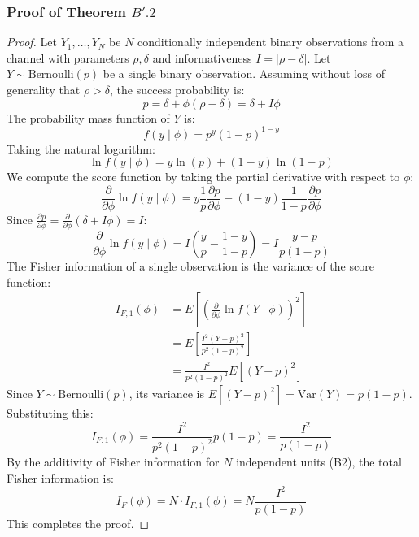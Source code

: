 \documentclass[11pt,a4paper]{article}
\begin{document}
\subsubsection{Proof of Theorem $B'.2$}
\begin{proof}
Let $Y_1, \dots, Y_N$ be $N$ conditionally independent binary observations from a channel with parameters $\rho, \delta$ and informativeness $I = |\rho - \delta|$. Let $Y \sim \text{Bernoulli}(p)$ be a single binary observation. Assuming without loss of generality that $\rho > \delta$, the success probability is:
\[
p = \delta + \phi(\rho - \delta) = \delta + I\phi
\]
The probability mass function of $Y$ is:
\[
f(y \mid \phi) = p^y (1 - p)^{1 - y}
\]
Taking the natural logarithm:
\[
\ln f(y \mid \phi) = y \ln(p) + (1 - y) \ln(1 - p)
\]
We compute the score function by taking the partial derivative with respect to $\phi$:
\[
\frac{\partial}{\partial \phi} \ln f(y \mid \phi) = y \frac{1}{p} \frac{\partial p}{\partial \phi} - (1 - y) \frac{1}{1 - p} \frac{\partial p}{\partial \phi}
\]
Since $\frac{\partial p}{\partial \phi} = \frac{\partial}{\partial \phi} (\delta + I\phi) = I$:
\[
\frac{\partial}{\partial \phi} \ln f(y \mid \phi) = I \left( \frac{y}{p} - \frac{1 - y}{1 - p} \right) = I \frac{y - p}{p(1 - p)}
\]
The Fisher information of a single observation is the variance of the score function:
\begin{align*}
    I_{F, 1}(\phi) &= E\left[ \left( \frac{\partial}{\partial \phi} \ln f(Y \mid \phi) \right)^2 \right] \\
    &= E\left[ \frac{I^2 (Y - p)^2}{p^2 (1 - p)^2} \right] \\
    &= \frac{I^2}{p^2 (1 - p)^2} E[(Y - p)^2]
\end{align*}
Since $Y \sim \text{Bernoulli}(p)$, its variance is $E[(Y - p)^2] = \text{Var}(Y) = p(1-p)$. Substituting this:
\[
I_{F, 1}(\phi) = \frac{I^2}{p^2 (1 - p)^2} p(1 - p) = \frac{I^2}{p(1 - p)}
\]
By the additivity of Fisher information for $N$ independent units (B2), the total Fisher information is:
\[
I_F(\phi) = N \cdot I_{F, 1}(\phi) = N \frac{I^2}{p(1 - p)}
\]
This completes the proof.
\end{proof}
\end{document}

